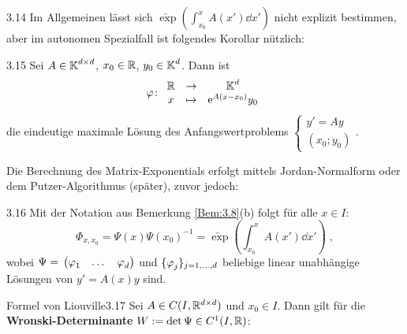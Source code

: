 \documentclass[a4paper]{article}
\begin{document}
\begin{Bemerkung}{}{3.14}
Im Allgemeinen lässt sich $\overleftarrow{\exp}\left(\int_{x_0}^xA(x')\dd x'\right)$ nicht explizit bestimmen, aber im autonomen Spezialfall ist folgendes Korollar nützlich:
\end{Bemerkung}

\begin{Kor}{}{3.15}
Sei $A\in\operatorname{\mathbb K}^{d\times d}$, $x_0\in\mathbb R$, $y_0\in\operatorname{\mathbb K}^d$. Dann ist
\[\operatorname{\varphi}\colon \begin{array}{clc}
\mathbb R&\to&\operatorname{\mathbb K}^d\\
x&\mapsto&\mathrm{e}^{A(x-x_0)}y_0
\end{array}\]
die eindeutige maximale Lösung des Anfangswertproblems $\left\{\begin{array}{c}
y'=Ay\\(x_0;y_0)
\end{array}\right. $.
\end{Kor}

Die Berechnung des Matrix-Exponentials erfolgt mittels Jordan-Normalform oder dem Putzer-Algorithmus (später), zuvor jedoch:

\begin{Kor}{}{3.16}
Mit der Notation aus Bemerkung \ref{Bem:3.8}(b) folgt für alle $x\in I$:
\[\Phi_{x,x_0}=\Psi(x)\Psi(x_0)^{-1}=\overleftarrow{\exp}\left(\int_{x_0}^xA(x')\dd x'\right)\;,\]
wobei $\Psi=\mathop{}\begin{pmatrix}\operatorname{\varphi}_1&\dots&\operatorname{\varphi}_d\end{pmatrix}$ und $\{\operatorname{\varphi}_j\}_{j=1,\ldots,d}$ beliebige linear unabhängige Lösungen von $y'=A(x)y$ sind.
\end{Kor}

\begin{Satz}{Formel von Liouville}{3.17}
Sei $A\in C(I,\mathbb R^{d\times d})$ und $x_0\in I$. Dann gilt für die \textbf{Wronski-Determinante} $W:=\det \Psi\in C^1(I,\mathbb R)$:
\begin{center}
\end{center}
\end{Satz}
\end{document}
